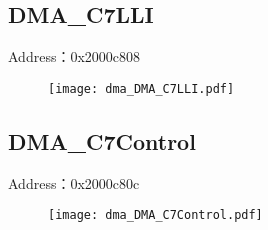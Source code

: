 \subsection{DMA\_C7LLI}
\label{dma-DMA-C7LLI}
Address：0x2000c808
 \begin{figure}[H]
\texttt{[image: dma\_DMA\_C7LLI.pdf]}
\end{figure}

\subsection{DMA\_C7Control}
\label{dma-DMA-C7Control}
Address：0x2000c80c
 \begin{figure}[H]
\texttt{[image: dma\_DMA\_C7Control.pdf]}
\end{figure}

